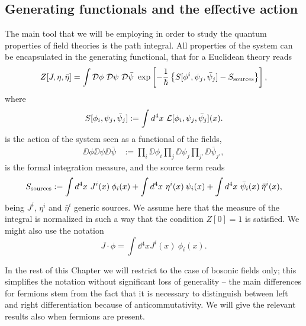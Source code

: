 \subsection{Generating functionals and the effective action} \label{basic-definitions}


The main tool that we will be employing in order to study the quantum properties of field theories is the path integral. All properties of the system can be encapsulated in the generating functional, that for a Euclidean theory reads
\begin{equation}\label{pi-generating-functional}
Z[J, \eta, \bar \eta ]
	=
\int  \mathcal{D}\phi\   \mathcal{D}\psi\   \mathcal{D}\bar\psi\  \exp\left[ { -\frac{1}{\hbar}\left\lbrace S[\phi^i, \psi_j, \bar \psi_j] - { S_\text{sources} } \right\rbrace } \right],
\end{equation}
where 
\begin{equation}
S[\phi_i, \psi_j, \bar \psi_j] := \int d^4 x\  { \mathcal{L} } [\phi_i, \psi_j, \bar \psi_j](x).
\end{equation}
is the action of the system seen as a functional of the fields,
\begin{align}
\DD{\phi}  \DD{\psi}  \DD{\bar\psi} &:= \prod_i \DD{\phi_i}
\prod_j \DD{\psi_j}
\prod_{j'} \DD{\bar \psi_{j'}} ,
\end{align}
is the formal integration measure, and the source term reads
\begin{align}
{ S_\text{sources} }
	:=
 \int  d^4 x\  J^i(x) \: \phi_i(x)
 + \int  d^4 x\  \eta^i(x) \: \psi_i(x)
 + \int  d^4 x\  \bar \psi_i(x) \: \bar \eta^i(x),
\end{align}
being $J^i$, $\eta^i$ and $\bar \eta^i$ generic sources.
We assume here that the measure of the integral is normalized in such a way that the condition
\(
Z[0] = 1
\) 
is satisfied. We might also use the notation
\begin{equation}
J \cdot \phi = \int \dd{^4 x} J^i(x) \: \phi_i(x).
\end{equation}


In the rest of this Chapter we will restrict to the case of bosonic fields only; this simplifies the notation without significant loss of generality -- the main differences for fermions stem from the fact that it is necessary to distinguish between left and right differentiation because of anticommutativity. We will give the relevant results also when fermions are present.



